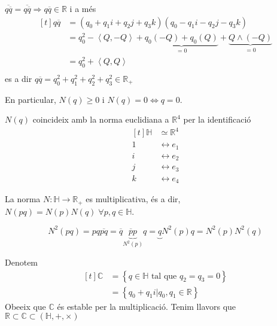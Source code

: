 \documentclass[../main.tex]{subfiles}
\begin{document}
	\begin{obs}
	    $\overline{q\overline{q}} = \overline{q\overline{q}} \Rightarrow q\overline{q} \in \mathbb{R}$ i a més
		\begin{displaymath}
			\begin{aligned}[t]
				q\overline{q} &= (q_0 + q_1i + q_2j + q_3k)(q_0 - q_1i - q_2j - q_3k)\\
							  &= q_0^2 - \left\langle Q, -Q\right\rangle + \underbrace{q_0\left(-Q\right) + q_0\left(Q\right)}_{=0} + \underbrace{Q \wedge (-Q)}_{=0}\\
							  &= q_0^2 + \left\langle Q, Q\right\rangle\\
			\end{aligned}
		\end{displaymath}
		es a dir $q\overline{q} = q_0^2+q_1^2+q_2^2+q_3^2 \in \mathbb{R}_+$
	\end{obs}
	En particular, $N(q) \geq 0$ i $ N(q) = 0 \iff q = 0$.
	\begin{obs}
		$N(q)$ coincideix amb la norma euclidiana a $\mathbb{R}^4$ per la identificació
		\begin{displaymath}
			\begin{aligned}[t]
				\mathbb{H} &\simeq \mathbb{R}^4\\
				1 &\leftrightarrow e_1\\
				i &\leftrightarrow e_2\\
				j &\leftrightarrow e_3\\
				k &\leftrightarrow e_4
			\end{aligned}
		\end{displaymath}
	\end{obs}
	\begin{proposicio}
		La norma $N : \mathbb{H} \to \mathbb{R}_+$ es multiplicativa, és a dir, $N(pq) = N(p)N(q)\;\forall p,q \in \mathbb{H}$.
	\end{proposicio}
	\begin{demostracio}
		\begin{displaymath}
			N^2(pq) = pq\overline{pq} = \overline{q}\underbrace{\overline{p}p}_{N^2(p)}q = \underbrace{q}N^2(p)q = N^2(p)N^2(q)
		\end{displaymath}
	\end{demostracio}
	\begin{obs}
		Denotem
		\begin{displaymath}
			\begin{aligned}[t]
				\mathbb{C} &= \left\{q \in \mathbb{H} \text{ tal que } q_2 = q_3 = 0\right\}\\
						   &= \left\{q_0 + q_1i | q_0, q_1 \in \mathbb{R}\right\}
			\end{aligned}
		\end{displaymath}
		Obeeix que $\mathbb{C}$ és estable per la multiplicació.
		Tenim llavors que $\mathbb{R} \subset \mathbb{C} \subset (\mathbb{H}, +, \times)$
	\end{obs}
\end{document}
